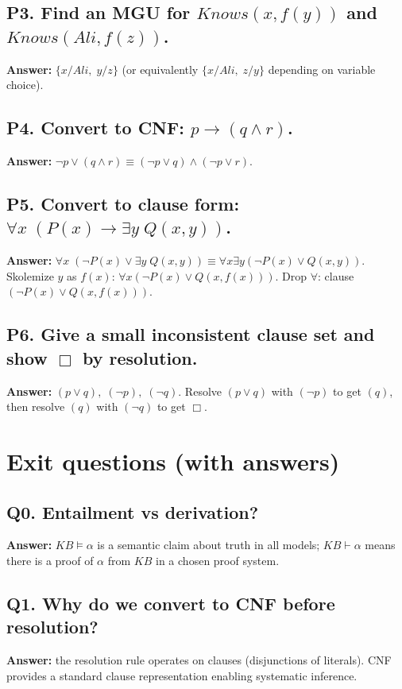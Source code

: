 \documentclass[11pt]{article}
\begin{document}
\subsection*{P3. Find an MGU for $Knows(x, f(y))$ and $Knows(Ali, f(z))$.}
\textbf{Answer:} $\{x/Ali,\; y/z\}$ (or equivalently $\{x/Ali,\; z/y\}$ depending on variable choice).

\subsection*{P4. Convert to CNF: $p \rightarrow (q \land r)$.}
\textbf{Answer:} $\lnot p \lor (q \land r) \equiv (\lnot p \lor q) \land (\lnot p \lor r)$.

\subsection*{P5. Convert to clause form: $\forall x\; (P(x) \rightarrow \exists y\; Q(x,y))$.}
\textbf{Answer:} $\forall x\; (\lnot P(x) \lor \exists y\; Q(x,y)) \equiv \forall x \exists y (\lnot P(x) \lor Q(x,y))$. Skolemize $y$ as $f(x)$: $\forall x (\lnot P(x) \lor Q(x,f(x)))$. Drop $\forall$: clause $(\lnot P(x) \lor Q(x,f(x)))$.

\subsection*{P6. Give a small inconsistent clause set and show $\Box$ by resolution.}
\textbf{Answer:} $(p \lor q),\;(\lnot p),\;(\lnot q)$. Resolve $(p \lor q)$ with $(\lnot p)$ to get $(q)$, then resolve $(q)$ with $(\lnot q)$ to get $\Box$.

\section{Exit questions (with answers)}

\subsection*{Q0. Entailment vs derivation?}
\textbf{Answer:} $KB \models \alpha$ is a semantic claim about truth in all models; $KB \vdash \alpha$ means there is a proof of $\alpha$ from $KB$ in a chosen proof system.

\subsection*{Q1. Why do we convert to CNF before resolution?}
\textbf{Answer:} the resolution rule operates on clauses (disjunctions of literals). CNF provides a standard clause representation enabling systematic inference.
\end{document}
